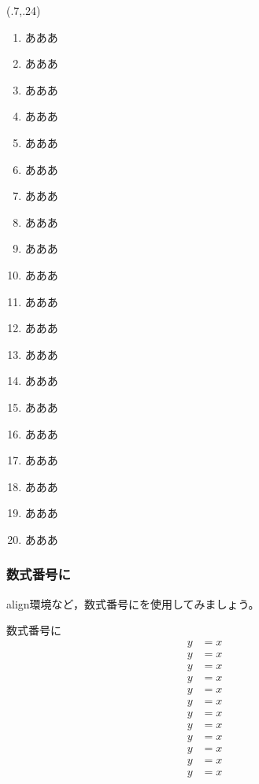 \begin{showEx}(.7,.24){}
\begin{enumerate}[\protect\expandafter\emPmaru 1]
  \item あああ
  \item あああ
  \item あああ
  \item あああ
  \item あああ
  \item あああ
  \item あああ
  \item あああ
  \item あああ
  \item あああ
  \item あああ
  \item あああ
  \item あああ
  \item あああ
  \item あああ
  \item あああ
  \item あああ
  \item あああ
  \item あああ
  \item あああ
\end{enumerate}
\end{showEx}

\subsubsection{数式番号に}
\textsf{align}環境など，数式番号にを使用してみましょう。

\begin{showEx}{数式番号に}
\def\tagform#1{\emPmaru{#1}}
\begin{align}
  y &= x\\
  y &= x\\
  y &= x\\
  y &= x\\
  y &= x\\
  y &= x\\
  y &= x\\
  y &= x\\
  y &= x\\
  y &= x\\
  y &= x\\
  y &= x
\end{align}
\end{showEx}

